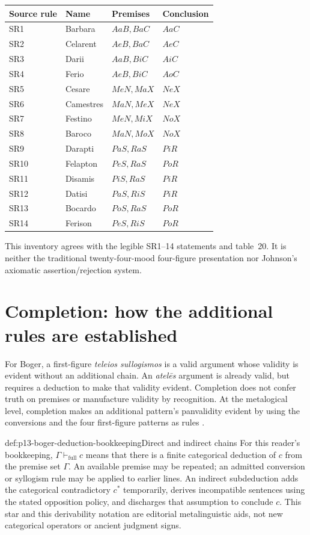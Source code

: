 \begin{tabularx}{\textwidth}{@{}l l X l@{}}
\toprule
Source rule & Name & Premises & Conclusion\\
\midrule
SR1 & Barbara & \(AaB,BaC\) & \(AaC\)\\
SR2 & Celarent & \(AeB,BaC\) & \(AeC\)\\
SR3 & Darii & \(AaB,BiC\) & \(AiC\)\\
SR4 & Ferio & \(AeB,BiC\) & \(AoC\)\\
SR5 & Cesare & \(MeN,MaX\) & \(NeX\)\\
SR6 & Camestres & \(MaN,MeX\) & \(NeX\)\\
SR7 & Festino & \(MeN,MiX\) & \(NoX\)\\
SR8 & Baroco & \(MaN,MoX\) & \(NoX\)\\
SR9 & Darapti & \(PaS,RaS\) & \(PiR\)\\
SR10 & Felapton & \(PeS,RaS\) & \(PoR\)\\
SR11 & Disamis & \(PiS,RaS\) & \(PiR\)\\
SR12 & Datisi & \(PaS,RiS\) & \(PiR\)\\
SR13 & Bocardo & \(PoS,RaS\) & \(PoR\)\\
SR14 & Ferison & \(PeS,RiS\) & \(PoR\)\\
\bottomrule
\end{tabularx}

This inventory agrees with the legible SR1--14 statements and table~20.
It is neither the traditional twenty-four-mood four-figure presentation nor
Johnson's axiomatic assertion/rejection system.

\section{Completion: how the additional rules are established}
\label{sec:p13-boger-completion}

For Boger, a first-figure \emph{teleios sullogismos} is a valid argument whose
validity is evident without an additional chain. An \emph{atel\={e}s} argument
is already valid, but requires a deduction to make that validity evident.
Completion does not confer truth on premises or manufacture validity by
recognition. At the metalogical level, completion makes an additional pattern's
panvalidity evident by using the conversions and the four first-figure patterns
as rules \parencite[pp.~183--188]{Boger2004UnderlyingLogic}.

\begin{hbdefinition}{def:p13-boger-deduction-bookkeeping}{Direct and indirect chains}
For this reader's bookkeeping, \(\Gamma\vdash_{\mathrm{full}}c\) means that
there is a finite categorical deduction of \(c\) from the premise set
\(\Gamma\). An available premise may be repeated; an admitted conversion or
syllogism rule may be applied to earlier lines. An indirect subdeduction adds
the categorical contradictory \(c^{*}\) temporarily, derives incompatible
sentences using the stated opposition policy, and discharges that assumption
to conclude \(c\). This star and this derivability notation are editorial
metalinguistic aids, not new categorical operators or ancient judgment signs.
\end{hbdefinition}

